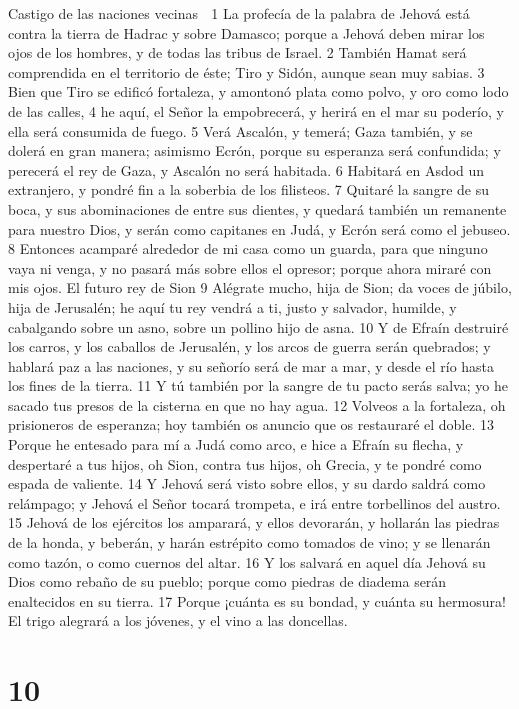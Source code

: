 Castigo de las naciones vecinas

1 La profecía de la palabra de Jehová está contra la tierra de Hadrac y sobre Damasco; porque a Jehová deben mirar los ojos de los hombres, y de todas las tribus de Israel.
2 También Hamat será comprendida en el territorio de éste; Tiro y Sidón, aunque sean muy sabias.
3 Bien que Tiro se edificó fortaleza, y amontonó plata como polvo, y oro como lodo de las calles,
4 he aquí, el Señor la empobrecerá, y herirá en el mar su poderío, y ella será consumida de fuego.
5 Verá Ascalón, y temerá; Gaza también, y se dolerá en gran manera; asimismo Ecrón, porque su esperanza será confundida; y perecerá el rey de Gaza, y Ascalón no será habitada.
6 Habitará en Asdod un extranjero, y pondré fin a la soberbia de los filisteos. 
7 Quitaré la sangre de su boca, y sus abominaciones de entre sus dientes, y quedará también un remanente para nuestro Dios, y serán como capitanes en Judá, y Ecrón será como el jebuseo.
8 Entonces acamparé alrededor de mi casa como un guarda, para que ninguno vaya ni venga, y no pasará más sobre ellos el opresor; porque ahora miraré con mis ojos.
El futuro rey de Sion
9 Alégrate mucho, hija de Sion; da voces de júbilo, hija de Jerusalén; he aquí tu rey vendrá a ti, justo y salvador, humilde, y cabalgando sobre un asno, sobre un pollino hijo de asna. 
10 Y de Efraín destruiré los carros, y los caballos de Jerusalén, y los arcos de guerra serán quebrados; y hablará paz a las naciones, y su señorío será de mar a mar, y desde el río hasta los fines de la tierra. 
11 Y tú también por la sangre de tu pacto serás salva; yo he sacado tus presos de la cisterna en que no hay agua.
12 Volveos a la fortaleza, oh prisioneros de esperanza; hoy también os anuncio que os restauraré el doble.
13 Porque he entesado para mí a Judá como arco, e hice a Efraín su flecha, y despertaré a tus hijos, oh Sion, contra tus hijos, oh Grecia, y te pondré como espada de valiente.
14 Y Jehová será visto sobre ellos, y su dardo saldrá como relámpago; y Jehová el Señor tocará trompeta, e irá entre torbellinos del austro.
15 Jehová de los ejércitos los amparará, y ellos devorarán, y hollarán las piedras de la honda, y beberán, y harán estrépito como tomados de vino; y se llenarán como tazón, o como cuernos del altar.
16 Y los salvará en aquel día Jehová su Dios como rebaño de su pueblo; porque como piedras de diadema serán enaltecidos en su tierra.
17 Porque ¡cuánta es su bondad, y cuánta su hermosura! El trigo alegrará a los jóvenes, y el vino a las doncellas.

\chapter{10}

